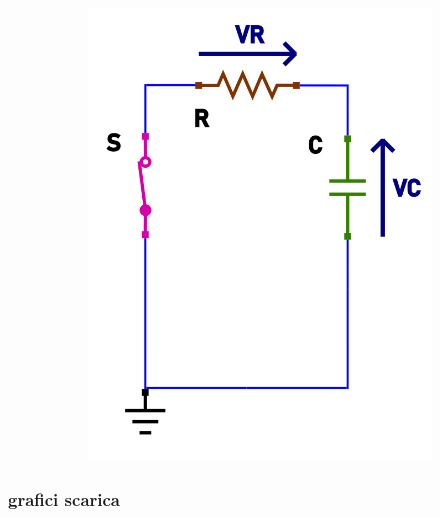\documentclass{article}
\begin{document}
\begin{figure}[h!]
\begin{subfigure}[b]{0.347\linewidth}
    \includegraphics[width=\linewidth]{data/scarica-tensioni.png}
  \end{subfigure}
\end{figure}

\subsubsection*{grafici scarica}
\end{document}
